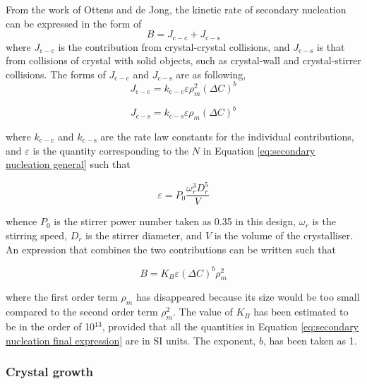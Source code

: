 From the work of Ottens and de Jong, \cite{ottens_model_1974} the kinetic rate of secondary nucleation can be expressed in the form of 
\begin{equation}
    B = J_{\mathrm{c-c}} + J_{\mathrm{c-s}}
\end{equation}
 where $J_{\mathrm{c-c}}$ is the contribution from crystal-crystal collisions, and $J_{\mathrm{c-s}}$ is that from collisions of crystal with solid objects, such as crystal-wall and crystal-stirrer collisions. The forms of $J_{\mathrm{c-c}}$ and $J_{\mathrm{c-s}}$ are as following,
\begin{equation}
    J_{\mathrm{c-c}} = k_{\mathrm{c-c}} \varepsilon \rho_m^2 (\Delta C)^b
\end{equation}

\begin{equation}
    J_{\mathrm{c-s}} = k_{\mathrm{c-s}} \varepsilon \rho_m (\Delta C)^b
\end{equation}

\noindent where $k_{\mathrm{c-c}}$ and $k_{\mathrm{c-s}}$ are the rate law constants for the individual contributions, and $\varepsilon$ is the quantity corresponding to the $N$ in Equation \ref{eq:secondary nucleation general} such that 

\begin{equation}
    \varepsilon = P_0 \frac{\omega_r^3 D_r^5}{V} 
\end{equation}

\noindent whence $P_0$ is the stirrer power number taken as 0.35 in this design, $\omega_r$ is the stirring speed, $D_r$ is the stirrer diameter, and $V$ is the volume of the crystalliser. An expression that combines the two contributions can be written such that 

\begin{equation} \label{eq:secondary nucleation final expression}
    B = K_B \varepsilon (\Delta C)^b \rho_m^2
\end{equation}

\noindent where the first order term $\rho_m$ has disappeared because its size would be too small compared to the second order term $\rho_m^2$. The value of $K_B$ has been estimated to be in the order of 10$^{13}$, \cite{bauer_contact_1974} provided that all the quantities in Equation \ref{eq:secondary nucleation final expression} are in SI units. The exponent, $b$, has been taken as 1. 

\subsubsection{Crystal growth} \label{sec: crystal growth}

